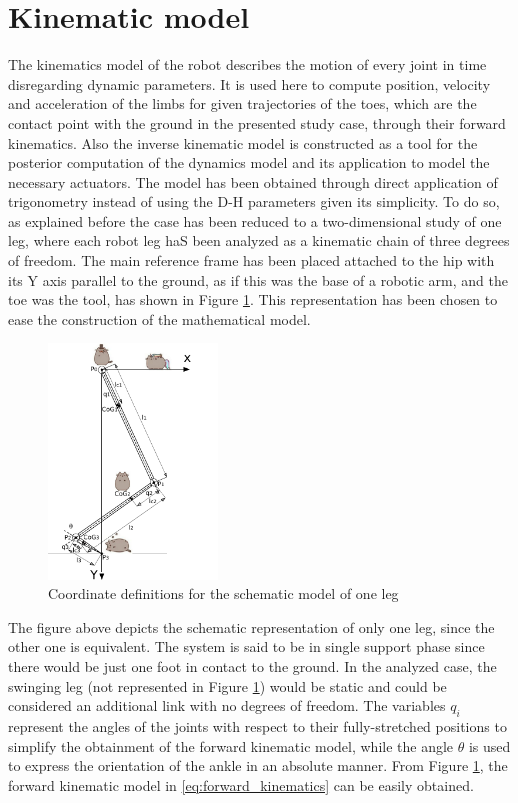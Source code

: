 
\section{Kinematic model}
\label{sec_kinematic_model}
The kinematics model of the robot describes the motion of every joint in time disregarding dynamic parameters.
It is used here to compute position, velocity and acceleration of the limbs for given trajectories of the toes, which are the contact point with the ground in the presented study case, through their forward kinematics.
Also the inverse kinematic model is constructed as a tool for the posterior computation of the dynamics model and its application to model the necessary actuators.
The model has been obtained through direct application of trigonometry instead of using the D-H parameters given its simplicity.
To do so, as explained before the case has been reduced to a two-dimensional study of one leg, where each robot leg haS been analyzed as a kinematic chain of three degrees of freedom.
The main reference frame has been placed attached to the hip with its Y axis parallel to the ground, as if this was the base of a robotic arm, and the toe was the tool, has shown in Figure \ref{fig:kinematics}.
This representation has been chosen to ease the construction of the mathematical model.

\begin{figure}[ht]
	\centering
	\includegraphics[width=0.4\textwidth]{figures/kinematics_model_kitties.pdf}
	\caption{Coordinate definitions for the schematic model of one leg}
	\label{fig:kinematics}
\end{figure}

The figure above depicts the schematic representation of only one leg, since the other one is equivalent. 
The system is said to be in single support phase since there would be just one foot in contact to the ground.
In the analyzed case, the swinging leg (not represented in Figure \ref{fig:kinematics}) would be static and could be considered an additional link with no degrees of freedom.
The variables $q_{i}$ represent the angles of the joints with respect to their fully-stretched positions to simplify the obtainment of the forward kinematic model, while the angle $\theta$ is used to express the orientation of the ankle in an absolute manner. 
From Figure \ref{fig:kinematics}, the forward kinematic model in \ref{eq:forward_kinematics} can be easily obtained.

